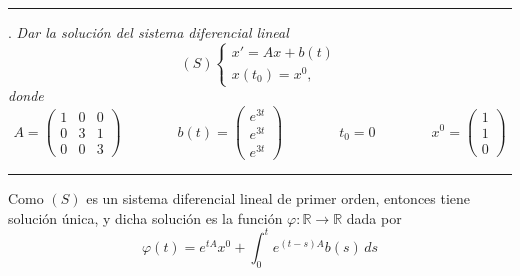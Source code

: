 \documentclass[11pt]{report}
\newcommand{\R}{\mathbb R}
\begin{document}
\vspace{2mm}

\hrule

\vspace{4mm}

. \textit{Dar la solución del sistema diferencial lineal}
\[(S)\begin{cases}
    x'=Ax+b(t) \\
    x(t_0)=x^0,
\end{cases}\]
\textit{donde}
\[A=\begin{pmatrix}
1 & 0 & 0 \\
0 & 3 & 1 \\
0 & 0 & 3
\end{pmatrix} \qquad \qquad b(t)=\begin{pmatrix}
    e^{3t} \\
    e^{3t} \\
    e^{3t}
\end{pmatrix} \qquad \qquad t_0=0 \qquad \qquad x^0=\begin{pmatrix}
    1 \\
    1 \\
    0
\end{pmatrix}\]

\vspace{2mm}

\hrule

\vspace{4mm}

Como $(S)$ es un sistema diferencial lineal de primer orden, entonces tiene solución única, y dicha solución es la función $\varphi \colon \R \to \R$ dada por
\[\varphi(t)=e^{tA}x^0+\int_{0}^te^{(t-s)A}b(s)\, ds\]
\end{document}

